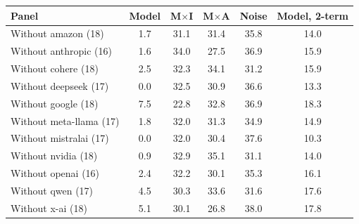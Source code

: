 \begin{tabular}{lccccc}
\toprule
Panel & Model & M$\times$I & M$\times$A & Noise & Model, 2-term \\
\midrule
Without amazon (18) & 1.7 & 31.1 & 31.4 & 35.8 & 14.0 \\
Without anthropic (16) & 1.6 & 34.0 & 27.5 & 36.9 & 15.9 \\
Without cohere (18) & 2.5 & 32.3 & 34.1 & 31.2 & 15.9 \\
Without deepseek (17) & 0.0 & 32.5 & 30.9 & 36.6 & 13.3 \\
Without google (18) & 7.5 & 22.8 & 32.8 & 36.9 & 18.3 \\
Without meta-llama (17) & 1.8 & 32.0 & 31.3 & 34.9 & 14.9 \\
Without mistralai (17) & 0.0 & 32.0 & 30.4 & 37.6 & 10.3 \\
Without nvidia (18) & 0.9 & 32.9 & 35.1 & 31.1 & 14.0 \\
Without openai (16) & 2.4 & 32.2 & 30.1 & 35.3 & 16.1 \\
Without qwen (17) & 4.5 & 30.3 & 33.6 & 31.6 & 17.6 \\
Without x-ai (18) & 5.1 & 30.1 & 26.8 & 38.0 & 17.8 \\
\bottomrule
\end{tabular}
